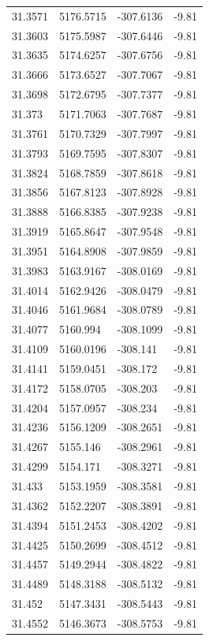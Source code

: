 \begin{table}[H]
\begin{tabular}{llll}
31.3571 & 5176.5715 & -307.6136 & -9.81 \\
31.3603 & 5175.5987 & -307.6446 & -9.81 \\
31.3635 & 5174.6257 & -307.6756 & -9.81 \\
31.3666 & 5173.6527 & -307.7067 & -9.81 \\
31.3698 & 5172.6795 & -307.7377 & -9.81 \\
31.373 & 5171.7063 & -307.7687 & -9.81 \\
31.3761 & 5170.7329 & -307.7997 & -9.81 \\
31.3793 & 5169.7595 & -307.8307 & -9.81 \\
31.3824 & 5168.7859 & -307.8618 & -9.81 \\
31.3856 & 5167.8123 & -307.8928 & -9.81 \\
31.3888 & 5166.8385 & -307.9238 & -9.81 \\
31.3919 & 5165.8647 & -307.9548 & -9.81 \\
31.3951 & 5164.8908 & -307.9859 & -9.81 \\
31.3983 & 5163.9167 & -308.0169 & -9.81 \\
31.4014 & 5162.9426 & -308.0479 & -9.81 \\
31.4046 & 5161.9684 & -308.0789 & -9.81 \\
31.4077 & 5160.994 & -308.1099 & -9.81 \\
31.4109 & 5160.0196 & -308.141 & -9.81 \\
31.4141 & 5159.0451 & -308.172 & -9.81 \\
31.4172 & 5158.0705 & -308.203 & -9.81 \\
31.4204 & 5157.0957 & -308.234 & -9.81 \\
31.4236 & 5156.1209 & -308.2651 & -9.81 \\
31.4267 & 5155.146 & -308.2961 & -9.81 \\
31.4299 & 5154.171 & -308.3271 & -9.81 \\
31.433 & 5153.1959 & -308.3581 & -9.81 \\
31.4362 & 5152.2207 & -308.3891 & -9.81 \\
31.4394 & 5151.2453 & -308.4202 & -9.81 \\
31.4425 & 5150.2699 & -308.4512 & -9.81 \\
31.4457 & 5149.2944 & -308.4822 & -9.81 \\
31.4489 & 5148.3188 & -308.5132 & -9.81 \\
31.452 & 5147.3431 & -308.5443 & -9.81 \\
31.4552 & 5146.3673 & -308.5753 & -9.81 \\

\end{tabular}
\end{table}
